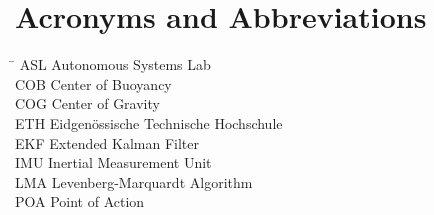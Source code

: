 \section*{Acronyms and Abbreviations}

\begin{tabbing}
 \hspace*{1.6cm}  \= \kill
 ASL \> Autonomous Systems Lab \\[0.5ex]
 COB \> Center of Buoyancy \\[0.5ex]
 COG \> Center of Gravity \\[0.5ex]
 ETH \> Eidgenössische Technische Hochschule \\[0.5ex]
 EKF \> Extended Kalman Filter \\[0.5ex]
 IMU \> Inertial Measurement Unit \\[0.5ex]
 LMA \> Levenberg-Marquardt Algorithm \\[0.5ex]
 POA \> Point of Action \\[0.5ex]
\end{tabbing}